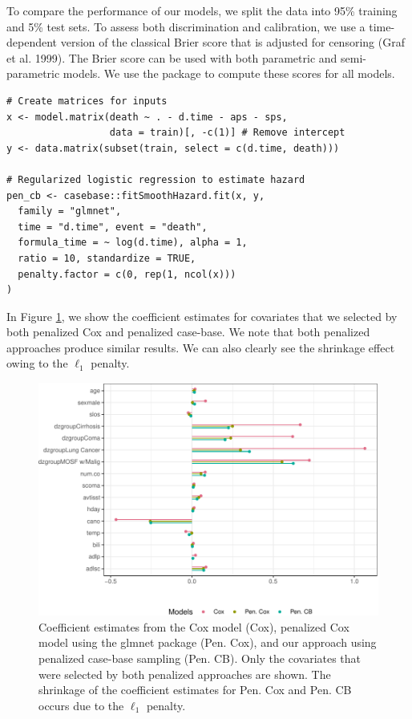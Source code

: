 To compare the performance of our models, we split the data into 95\% training and 5\% test sets. To assess both discrimination and calibration, we use a time-dependent version of the classical Brier score that is adjusted for censoring (Graf et al. 1999). The Brier score can be used with both parametric and semi-parametric models. We use the  package to compute these scores for all models.

\begin{verbatim}
# Create matrices for inputs
x <- model.matrix(death ~ . - d.time - aps - sps, 
                  data = train)[, -c(1)] # Remove intercept
y <- data.matrix(subset(train, select = c(d.time, death)))

# Regularized logistic regression to estimate hazard
pen_cb <- casebase::fitSmoothHazard.fit(x, y,
  family = "glmnet",
  time = "d.time", event = "death",
  formula_time = ~ log(d.time), alpha = 1,
  ratio = 10, standardize = TRUE,
  penalty.factor = c(0, rep(1, ncol(x)))
)
\end{verbatim}

In Figure \ref{fig:cs3lolliPlot}, we show the coefficient estimates for covariates that we selected by both penalized Cox and penalized case-base. We note that both penalized approaches produce similar results. We can also clearly see the shrinkage effect owing to the \(\ell_1\) penalty.

\begin{figure}[ht]
\includegraphics[width=\textwidth,keepaspectratio=true]{./cs3lolliPlot-1} \caption{Coefficient estimates from the Cox model (Cox), penalized Cox model using the glmnet package (Pen. Cox), and our approach using penalized case-base sampling (Pen. CB). Only the covariates that were selected by both penalized approaches are shown. The shrinkage of the coefficient estimates for Pen. Cox and Pen. CB occurs due to the $\ell_1$ penalty.}\label{fig:cs3lolliPlot}
\end{figure}

